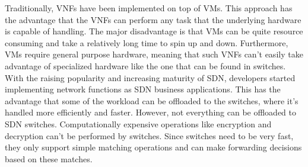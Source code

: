 Traditionally, \acsp{VNF} have been implemented on top of \acsp{VM}. This approach has the advantage that the \acsp{VNF} can perform any task that the underlying hardware is capable of handling. The major disadvantage is that \acsp{VM} can be quite resource consuming and take a relatively long time to spin up and down. Furthermore, \acsp{VM} require general purpose hardware, meaning that such \acsp{VNF} can't easily take advantage of specialized hardware like the one that can be found in switches. With the raising popularity and increasing maturity of \acs{SDN}, developers started implementing network functions as \acs{SDN} business applications. This has the advantage that some of the workload can be offloaded to the switches, where it's handled more efficiently and faster. However, not everything can be offloaded to \acs{SDN} switches. Computationally expensive operations like encryption and decryption can't be performed by switches. Since switches need to be very fast, they only support simple matching operations and can make forwarding decisions based on these matches.


%
%
%



